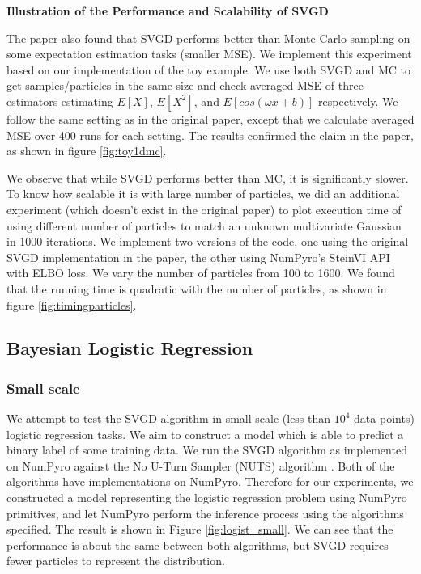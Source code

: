 \noindent\textbf{Illustration of the Performance and Scalability of SVGD}

The paper also found that SVGD performs better than Monte Carlo sampling on some expectation estimation tasks (smaller MSE). We implement this experiment based on our implementation of the toy example. We use both SVGD and MC to get samples/particles in the same size and check averaged MSE of three estimators estimating $E[X]$, $E[X^2]$, and $E[cos(\omega x + b)]$ respectively. We follow the same setting as in the original paper, except that we calculate averaged MSE over 400 runs for each setting. The results confirmed the claim in the paper, as shown in figure \ref{fig:toy1dmc}.



We observe that while SVGD performs better than MC, it is significantly slower. To know how scalable it is with large number of particles, we did an additional experiment (which doesn't exist in the original paper) to plot execution time of using different number of particles to match an unknown multivariate Gaussian in 1000 iterations. We implement two versions of the code, one using the original SVGD implementation in the paper, the other using NumPyro's SteinVI API with ELBO loss. We vary the number of particles from 100 to 1600. We found that the 
running time is quadratic with the number of particles, as shown in figure \ref{fig:timingparticles}.



\subsection{Bayesian Logistic Regression}
\subsubsection{Small scale}
We attempt to test the SVGD algorithm in small-scale (less than $10^4$ data points) logistic regression tasks. We aim to construct a model which is able to predict a binary label of some training data. We run the SVGD algorithm as implemented on NumPyro against the No U-Turn Sampler (NUTS) algorithm \cite{nuts}. Both of the algorithms have implementations on NumPyro. Therefore for our experiments, we constructed a model representing the logistic regression problem using NumPyro primitives, and let NumPyro perform the inference process using the algorithms specified. The result is shown in Figure \ref{fig:logist_small}. We can see that the performance is about the same between both algorithms, but SVGD requires fewer particles to represent the distribution. 

